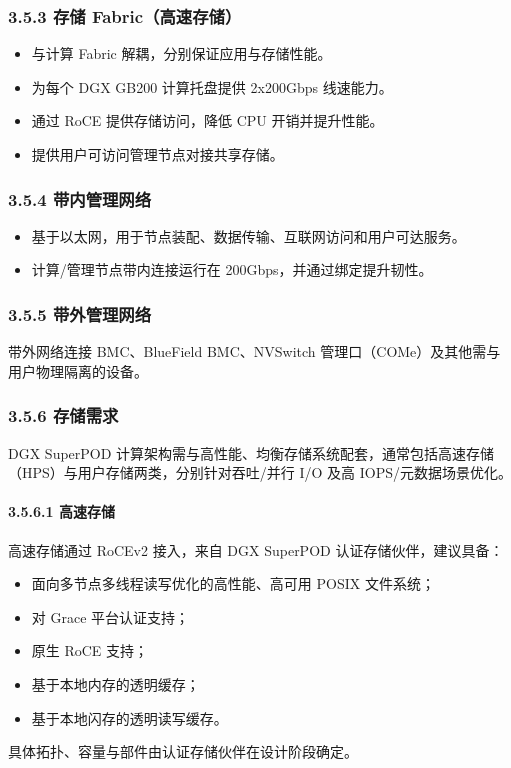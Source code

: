 \documentclass[10pt]{article}
\begin{document}
\subsubsection{3.5.3 存储 Fabric（高速存储）}
\begin{itemize}
\item 与计算 Fabric 解耦，分别保证应用与存储性能。
\item 为每个 DGX GB200 计算托盘提供 2x200Gbps 线速能力。
\item 通过 RoCE 提供存储访问，降低 CPU 开销并提升性能。
\item 提供用户可访问管理节点对接共享存储。
\end{itemize}

\subsubsection{3.5.4 带内管理网络}
\begin{itemize}
\item 基于以太网，用于节点装配、数据传输、互联网访问和用户可达服务。
\item 计算/管理节点带内连接运行在 200Gbps，并通过绑定提升韧性。
\end{itemize}

\subsubsection{3.5.5 带外管理网络}
带外网络连接 BMC、BlueField BMC、NVSwitch 管理口（COMe）及其他需与用户物理隔离的设备。

\subsubsection{3.5.6 存储需求}
DGX SuperPOD 计算架构需与高性能、均衡存储系统配套，通常包括高速存储（HPS）与用户存储两类，分别针对吞吐/并行 I/O 及高 IOPS/元数据场景优化。

\paragraph{3.5.6.1 高速存储}
高速存储通过 RoCEv2 接入，来自 DGX SuperPOD 认证存储伙伴，建议具备：
\begin{itemize}
\item 面向多节点多线程读写优化的高性能、高可用 POSIX 文件系统；
\item 对 Grace 平台认证支持；
\item 原生 RoCE 支持；
\item 基于本地内存的透明缓存；
\item 基于本地闪存的透明读写缓存。
\end{itemize}
具体拓扑、容量与部件由认证存储伙伴在设计阶段确定。
\end{document}
